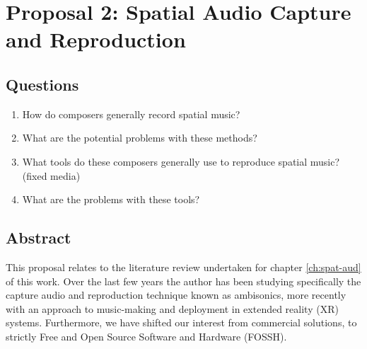 \chapter{Proposal 2: Spatial Audio Capture and Reproduction} \label{ch:prop-trs}




\section{Questions}
\begin{enumerate}
    \item How do composers generally record spatial music? 
    \item What are the potential problems with these methods?
    \item What tools do these composers generally use to reproduce spatial music? (fixed media)
    \item What are the problems with these tools?
\end{enumerate}

\section{Abstract}

This proposal relates to the literature review undertaken for chapter \ref{ch:spat-aud} of this work. Over the last few years the author has been studying specifically the capture audio and reproduction technique known as ambisonics, more recently with an approach to music-making and deployment in extended reality (XR) systems. Furthermore, we have shifted our interest from commercial solutions, to strictly Free and Open Source Software and Hardware (FOSSH).

